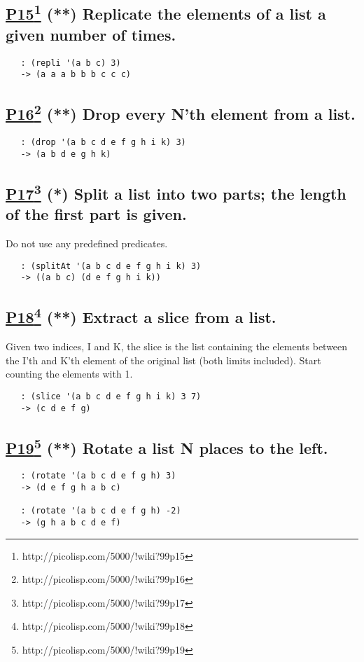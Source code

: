 \documentclass[10pt,a4paper]{article}
\begin{document}
\subsection*{\underline{P15}\footnote{http://picolisp.com/5000/!wiki?99p15} (**) Replicate the elements of a list a given number of times.}
\begin{verbatim}
   : (repli '(a b c) 3)
   -> (a a a b b b c c c)
\end{verbatim}


\subsection*{\underline{P16}\footnote{http://picolisp.com/5000/!wiki?99p16} (**) Drop every N'th element from a list.}
\begin{verbatim}
   : (drop '(a b c d e f g h i k) 3)
   -> (a b d e g h k)
\end{verbatim}


\subsection*{\underline{P17}\footnote{http://picolisp.com/5000/!wiki?99p17} (*) Split a list into two parts; the length of the first
part is given.}
Do not use any predefined predicates.
\begin{verbatim}
   : (splitAt '(a b c d e f g h i k) 3)
   -> ((a b c) (d e f g h i k))
\end{verbatim}


\subsection*{\underline{P18}\footnote{http://picolisp.com/5000/!wiki?99p18} (**) Extract a slice from a list.}
Given two indices, I and K, the slice is the list
containing the elements between the I'th and K'th element
of the original list (both limits included). Start counting
the elements with 1.
\begin{verbatim}
   : (slice '(a b c d e f g h i k) 3 7)
   -> (c d e f g)
\end{verbatim}


\subsection*{\underline{P19}\footnote{http://picolisp.com/5000/!wiki?99p19} (**) Rotate a list N places to the left.}
\begin{verbatim}
   : (rotate '(a b c d e f g h) 3)
   -> (d e f g h a b c)

   : (rotate '(a b c d e f g h) -2)
   -> (g h a b c d e f)
\end{verbatim}
\end{document}

